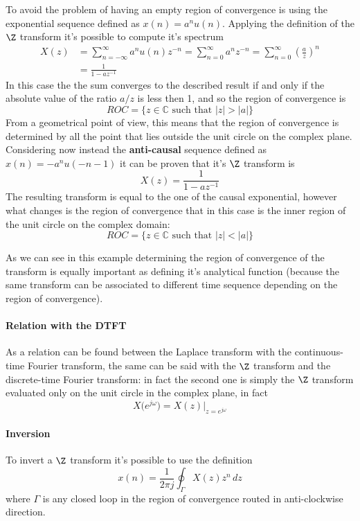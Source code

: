 	To avoid the problem of having an empty region of convergence is using the  exponential sequence defined as $x(n) = a^nu(n)$. Applying the definition of the $\Z$ transform it's possible to compute it's spectrum
	\begin{align*}
		X(z) & = \sum_{n=-\infty}^{\infty} a^n u(n) z^{-n} = \sum_{n=0}^\infty a^n z^{-n} = \sum_{n=0}^{\infty} \left(\frac a z\right)^n \\ 
		& = \frac{1}{1-az^{-1}}
	\end{align*}
	In this case the the sum converges to the described result if and only if the absolute value of the ratio $a/z$ is less then 1, and so the region of convergence is
	\[ ROC = \big\{ z\in \mathds C \textrm{ such that } |z| >|a| \big\} \]
	From a geometrical point of view, this means that the region of convergence is determined by all the point that lies outside the unit circle on the complex plane.\\
	Considering now instead the \textbf{anti-causal} sequence defined as $x(n) = -a^n u(-n-1)$ it can be proven that it's $\Z$ transform is
	\[ X(z) = \frac{1}{1-az^{-1}} \]
	The resulting transform is equal to the one of the causal exponential, however what changes is the region of convergence that in this case is the inner region of the unit circle on the complex domain:
	\[ ROC = \big\{ z\in \mathds C \textrm{ such that } |z| < |a| \big\} \]
	
	As we can see in this example determining the region of convergence of the transform is equally important as defining it's analytical function (because the same transform can be associated to different time sequence depending on the region of convergence).
	
	\paragraph{Relation with the DTFT} As a relation can be found between the Laplace transform with the continuous-time Fourier transform, the same can be said with the $\Z$ transform and the discrete-time Fourier transform: in fact the second one is simply the $\Z$ transform evaluated only on the unit circle in the complex plane, in fact
	\begin{equation}
		X\big(e^{j\omega}\big) = X(z) \Big|_{z=e^{j\omega}}
	\end{equation}
	
	\paragraph{Inversion} To invert a $\Z$ transform it's possible to use the definition
	\begin{equation}
		x(n) = \frac{1}{{2\pi j}} \oint_\Gamma X(z) z^n\, dz
	\end{equation}
	where $\Gamma$ is any closed loop in the region of convergence routed in anti-clockwise direction.
	
